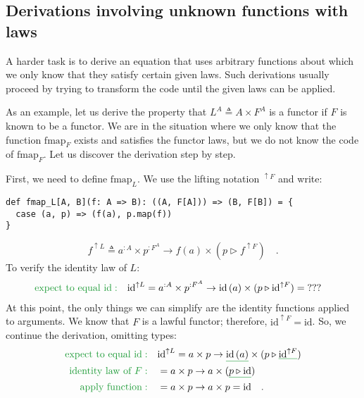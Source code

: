 \subsection{Derivations involving unknown functions with laws}

A harder task is to derive an equation that uses arbitrary functions
about which we only know that they satisfy certain given laws. Such
derivations usually proceed by trying to transform the code until
the given laws can be applied.

As an example, let us derive the property that $L^{A}\triangleq A\times F^{A}$
is a functor if $F$ is known to be a functor. We are in the situation
where we only know that the function $\text{fmap}_{F}$ exists and
satisfies the functor laws, but we do not know the code of $\text{fmap}_{F}$.
Let us discover the derivation step by step.

First, we need to define $\text{fmap}_{L}$. We use the lifting notation
$^{\uparrow F}$ and write:
\begin{lstlisting}
def fmap_L[A, B](f: A => B): ((A, F[A])) => (B, F[B]) = {
  case (a, p) => (f(a), p.map(f))
}
\end{lstlisting}
\[
f^{\uparrow L}\triangleq a^{:A}\times p^{:F^{A}}\rightarrow f(a)\times(p\triangleright f^{\uparrow F})\quad.
\]
To verify the identity law of $L$:
\begin{align*}
{\color{greenunder}\text{expect to equal }\text{id}:}\quad & \text{id}^{\uparrow L}=a^{:A}\times p^{:F^{A}}\rightarrow\text{id}\,(a)\times(p\triangleright\text{id}^{\uparrow F})=\text{???}
\end{align*}
At this point, the only things we can simplify are the identity functions
applied to arguments. We know that $F$ is a lawful functor; therefore,
$\text{id}^{\uparrow F}=\text{id}$. So, we continue the derivation,
omitting types:
\begin{align*}
{\color{greenunder}\text{expect to equal }\text{id}:}\quad & \text{id}^{\uparrow L}=a\times p\rightarrow\gunderline{\text{id}\,(a)}\times(p\triangleright\gunderline{\text{id}^{\uparrow F}})\\
{\color{greenunder}\text{identity law of }F:}\quad & =a\times p\rightarrow a\times(\gunderline{p\triangleright\text{id}})\\
{\color{greenunder}\text{apply function}:}\quad & =a\times p\rightarrow a\times p=\text{id}\quad.
\end{align*}

